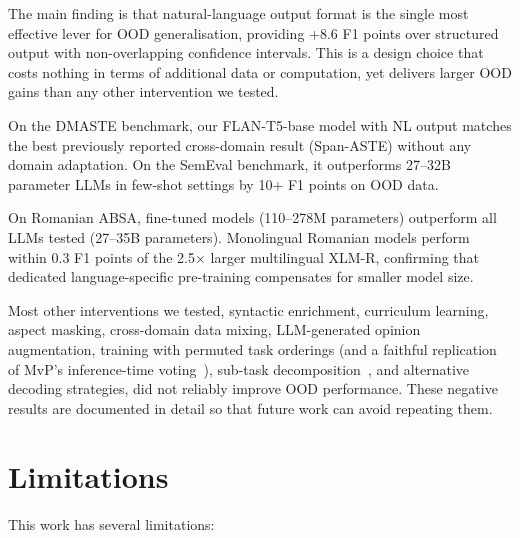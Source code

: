 \documentclass[12pt,a4paper]{report}
\begin{document}
The main finding is that natural-language output format is the single most effective lever for OOD generalisation, providing +8.6 F1 points over structured output with non-overlapping confidence intervals. This is a design choice that costs nothing in terms of additional data or computation, yet delivers larger OOD gains than any other intervention we tested.

On the DMASTE benchmark, our FLAN-T5-base model with NL output matches the best previously reported cross-domain result (Span-ASTE) without any domain adaptation. On the SemEval benchmark, it outperforms 27--32B parameter LLMs in few-shot settings by 10+ F1 points on OOD data.

On Romanian ABSA, fine-tuned models (110--278M parameters) outperform all LLMs tested (27--35B parameters). Monolingual Romanian models perform within 0.3 F1 points of the 2.5$\times$ larger multilingual XLM-R, confirming that dedicated language-specific pre-training compensates for smaller model size.

Most other interventions we tested, syntactic enrichment, curriculum learning, aspect masking, cross-domain data mixing, LLM-generated opinion augmentation, training with permuted task orderings (and a faithful replication of MvP's inference-time voting~\cite{gou2023mvp}), sub-task decomposition~\cite{xie2025star}, and alternative decoding strategies, did not reliably improve OOD performance. These negative results are documented in detail so that future work can avoid repeating them.

\section{Limitations}

This work has several limitations:
\end{document}

